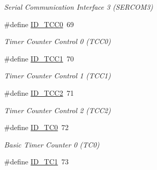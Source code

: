\begin{DoxyCompactItemize}
\begin{DoxyCompactList}\small\item\em Serial Communication Interface 3 (S\+E\+R\+C\+O\+M3) \end{DoxyCompactList}\item 
\hypertarget{group___s_a_m_l21_e18_a__id_gae710608f4c53680eb854f146b8cfd395}{}\#define \hyperlink{group___s_a_m_l21_e18_a__id_gae710608f4c53680eb854f146b8cfd395}{I\+D\+\_\+\+T\+C\+C0}~69\label{group___s_a_m_l21_e18_a__id_gae710608f4c53680eb854f146b8cfd395}

\begin{DoxyCompactList}\small\item\em Timer Counter Control 0 (T\+C\+C0) \end{DoxyCompactList}\item 
\hypertarget{group___s_a_m_l21_e18_a__id_ga3a4b71213e54d4a617589bc14d66502f}{}\#define \hyperlink{group___s_a_m_l21_e18_a__id_ga3a4b71213e54d4a617589bc14d66502f}{I\+D\+\_\+\+T\+C\+C1}~70\label{group___s_a_m_l21_e18_a__id_ga3a4b71213e54d4a617589bc14d66502f}

\begin{DoxyCompactList}\small\item\em Timer Counter Control 1 (T\+C\+C1) \end{DoxyCompactList}\item 
\hypertarget{group___s_a_m_l21_e18_a__id_ga933f0423071b10a976b58a760fa9c2b2}{}\#define \hyperlink{group___s_a_m_l21_e18_a__id_ga933f0423071b10a976b58a760fa9c2b2}{I\+D\+\_\+\+T\+C\+C2}~71\label{group___s_a_m_l21_e18_a__id_ga933f0423071b10a976b58a760fa9c2b2}

\begin{DoxyCompactList}\small\item\em Timer Counter Control 2 (T\+C\+C2) \end{DoxyCompactList}\item 
\hypertarget{group___s_a_m_l21_e18_a__id_ga17a38517c59418d9ed3b113d2d99eb6b}{}\#define \hyperlink{group___s_a_m_l21_e18_a__id_ga17a38517c59418d9ed3b113d2d99eb6b}{I\+D\+\_\+\+T\+C0}~72\label{group___s_a_m_l21_e18_a__id_ga17a38517c59418d9ed3b113d2d99eb6b}

\begin{DoxyCompactList}\small\item\em Basic Timer Counter 0 (T\+C0) \end{DoxyCompactList}\item 
\hypertarget{group___s_a_m_l21_e18_a__id_gad66f08edf02aeb734534bfd1a8bf1764}{}\#define \hyperlink{group___s_a_m_l21_e18_a__id_gad66f08edf02aeb734534bfd1a8bf1764}{I\+D\+\_\+\+T\+C1}~73\label{group___s_a_m_l21_e18_a__id_gad66f08edf02aeb734534bfd1a8bf1764}


\end{DoxyCompactItemize}
